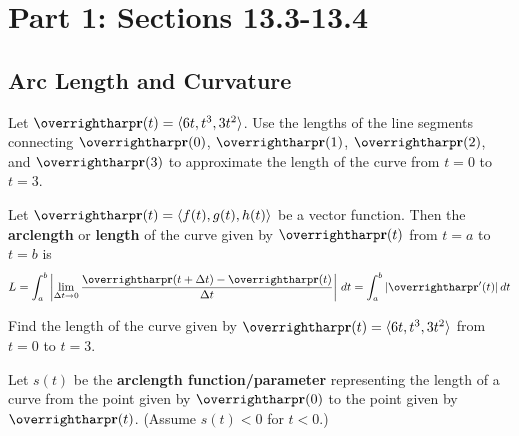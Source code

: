 \documentclass[letterpaper, twoside, 12pt]{book}
\begin{document}
\setcounter{chapter}{1}

\chapter{Part 1: Sections 13.3-13.4}

\setcounter{chapter}{13}
\setcounter{section}{2}

\section{Arc Length and Curvature}

          \begin{problem}
            Let $\vect{r}(t)=\<6t, t^3, 3t^2\>$. Use the lengths of
            the line segments
            connecting $\vect{r}(0)$, $\vect{r}(1)$, $\vect{r}(2)$,
            and $\vect{r}(3)$ to approximate the length of the curve
            from $t=0$ to $t=3$.
          \end{problem}

          \begin{solution}

          \end{solution}

\begin{definition}
Let $\harpvec{r}(t) = \<f(t),g(t),h(t)\>$ be a vector function.
Then the \textbf{arclength} or \textbf{length} of the curve given by
$\harpvec{r}(t)$ from $t=a$ to $t=b$ is
\[
  L
    =
  \int_a^b
  \left|
    \lim_{\Delta{t}\to0}
    \frac{\vect{r}(t+\Delta{t})-\vect{r}(t)}{\Delta{t}}
  \right|
  \dvar{t}
  =
  \int_a^b |\vect{r}'(t)| \dvar{t}
\]
\end{definition}

          \begin{problem}
            Find the length of the curve given by
            $\vect{r}(t)=\<6t, t^3, 3t^2\>$
            from $t=0$ to $t=3$.
          \end{problem}

          \begin{solution}

          \end{solution}

\begin{definition}
Let $s(t)$ be the \textbf{arclength function/parameter} representing the
length of a curve from the point given by
$\harpvec{r}(0)$ to the point given by $\harpvec{r}(t)$.
(Assume $s(t)<0$ for $t<0$.)
\end{definition}
\end{document}
